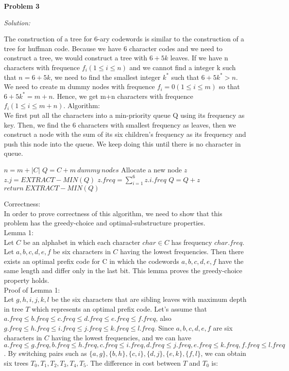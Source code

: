 \documentclass[12pt,letterpaper]{article}
\def\pp{\par\noindent}
\newcommand{\problem}[1]{ \bigskip \pp \textbf{Problem #1}\par}
\newcommand{\solution}{\textit{Solution:}\par}
\begin{document}
\problem{3}
\solution
The construction of a tree for 6-ary codewords is similar to the construction of a tree for huffman code. Because we have 6 character codes and we need to construct a tree, we would construct a tree with $6 + 5k$ leaves. If we have n characters with frequence $f_i (1 \le i \le n)$ and we cannot find a integer k such that $n = 6+5k$, we need to find the smallest integer $k^*$ such that $6+5k^* > n$. We need to create m dummy nodes with frequence $f_i = 0 (1 \le i \le m)$ so that $6+5k^* = m+n$. Hence, we get m+n characters with frequence $f_i (1 \le i \le m+n)$.
Algorithm: \\
We first put all the characters into a min-priority queue Q using its frequency as key. Then, we find the 6 characters with smallest frequency as leaves, then we construct a node with the sum of its six children's frequency as its frequency and push this node into the queue. We keep doing this until there is no character in queue. \\
\begin{algorithm}[H]
$n = m+|C|$ \;
$Q = C + m\ dummy\ nodes$ \;
{
Allocate a new node $z$ \;
  {
$z.j = EXTRACT-MIN(Q)$ \; 
 }
 $z.freq = \sum _{i=1} ^{6} z.i.freq$ \;
 $Q = Q + z$ \;
}
   $return\  EXTRACT-MIN(Q)$ \;
\end{algorithm}
Correctness: \\
In order to prove correctness of this algorithm, we need to show that this problem has the greedy-choice and optimal-substructure properties. \\
Lemma 1: \\
Let $C$ be an alphabet in which each character $char \in C$ has frequency $char.freq$. Let $a,b,c,d,e,f$ be six characters in $C$ having the lowest frequencies. Then there exists an optimal prefix code for C in which the codewords $a,b,c,d,e,f$ have the same length and differ only in the last bit. This lemma proves the greedy-choice property holds. \\
Proof of Lemma 1: \\
Let $g,h,i,j,k,l$ be the six characters that are sibling leaves with maximum depth in tree $T$ which represents an optimal prefix code. Let's assume that $a.freq \le b.freq \le c.freq \le d.freq \le e.freq \le f.freq$, also $g.freq \le h.freq \le i.freq \le j.freq \le k.freq \le l.freq$. Since $a,b,c,d,e,f$ are six characters in $C$ having the lowest frequencies, and we can have $a.freq \le g.freq, b.freq \le h.freq, c.freq \le i.freq, d.freq \le j.freq, e.freq \le k.freq, f.freq \le l.freq$. By switching pairs such as $\{a,g\}, \{b,h\}, \{c,i\}, \{d,j\}, \{e,k\}, \{f,l\}$, we can obtain six trees $T_0, T_1, T_2, T_3, T_4, T_5$. The difference in cost between $T$ and $T_0$ is: \\
\end{document}

